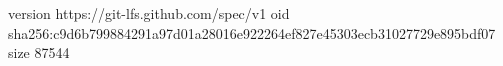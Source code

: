 version https://git-lfs.github.com/spec/v1
oid sha256:c9d6b799884291a97d01a28016e922264ef827e45303ecb31027729e895bdf07
size 87544
